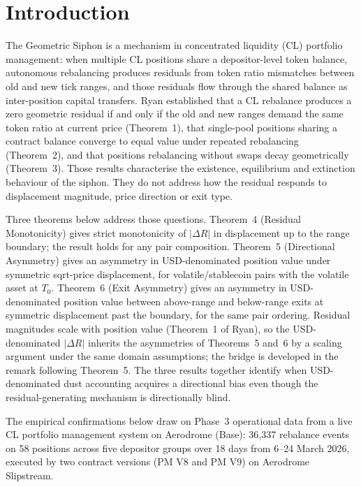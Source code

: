 \documentclass[11pt,a4paper]{article}
\theoremstyle{definition}
\begin{document}
\clearpage

\section{Introduction}\label{sec:introduction}

The Geometric Siphon is a mechanism in concentrated liquidity (CL) portfolio management: when multiple CL positions share a depositor-level token balance, autonomous rebalancing produces residuals from token ratio mismatches between old and new tick ranges, and those residuals flow through the shared balance as inter-position capital transfers. Ryan\cite{ryan2026a} established that a CL rebalance produces a zero geometric residual if and only if the old and new ranges demand the same token ratio at current price (Theorem~1), that single-pool positions sharing a contract balance converge to equal value under repeated rebalancing (Theorem~2), and that positions rebalancing without swaps decay geometrically (Theorem~3). Those results characterise the existence, equilibrium and extinction behaviour of the siphon. They do not address how the residual responds to displacement magnitude, price direction or exit type.

Three theorems below address those questions. Theorem~4 (Residual Monotonicity) gives strict monotonicity of $|\Delta R|$ in displacement up to the range boundary; the result holds for any pair composition. Theorem~5 (Directional Asymmetry) gives an asymmetry in USD-denominated position value under symmetric sqrt-price displacement, for volatile/stablecoin pairs with the volatile asset at $T_0$. Theorem~6 (Exit Asymmetry) gives an asymmetry in USD-denominated position value between above-range and below-range exits at symmetric displacement past the boundary, for the same pair ordering. Residual magnitudes scale with position value (Theorem~1 of Ryan\cite{ryan2026a}), so the USD-denominated $|\Delta R|$ inherits the asymmetries of Theorems~5 and~6 by a scaling argument under the same domain assumptions; the bridge is developed in the remark following Theorem~5. The three results together identify when USD-denominated dust accounting acquires a directional bias even though the residual-generating mechanism is directionally blind.

The empirical confirmations below draw on Phase~3 operational data from a live CL portfolio management system on Aerodrome (Base): 36{,}337 rebalance events on 58 positions across five depositor groups over 18 days from 6--24 March 2026, executed by two contract versions (PM V8 and PM V9) on Aerodrome Slipstream.
\end{document}

